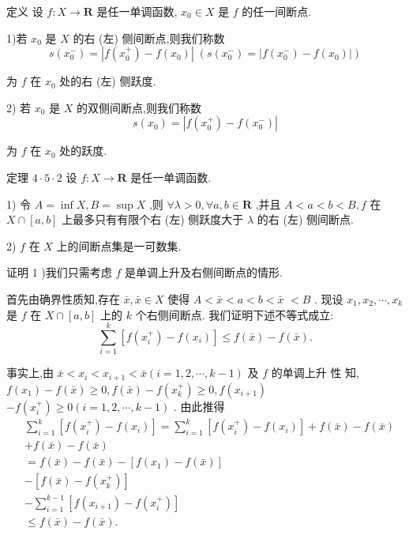 定义 设 $f : X \rightarrow  \mathbf{R}$ 是任一单调函数, ${x}_{0} \in  X$ 是 $f$ 的任一间断点.

1)若 ${x}_{0}$ 是 $X$ 的右 (左) 侧间断点,则我们称数
$$s\left( {x}_{0}^{ - }\right)  = \left| {f\left( {x}_{0}^{ + }\right)  - f\left( {x}_{0}\right) }\right| \;\left( {s\left( {x}_{0}^{ - }\right)  = \left| {f\left( {x}_{0}^{ - }\right)  - f\left( {x}_{0}\right) }\right| }\right)$$

为 $f$ 在 ${x}_{0}$ 处的右 (左) 侧跃度.

2) 若 ${x}_{0}$ 是 $X$ 的双侧间断点,则我们称数
$$s\left( {x}_{0}\right)  = \left| {f\left( {x}_{0}^{ + }\right)  - f\left( {x}_{0}^{ - }\right) }\right|$$

为 $f$ 在 ${x}_{0}$ 处的跃度.

定理 $4 \cdot  5 \cdot  2$ 设 $f : X \rightarrow  \mathbf{R}$ 是任一单调函数.

1) 令 $A = \inf X,B = \sup X$ ,则 $\forall \lambda  > 0,\forall a,b \in  \mathbf{R}$ ,并且 $A < a < b < B,f$ 在 $X \cap  \left\lbrack  {a,b}\right\rbrack$ 上最多只有有限个右 (左) 侧跃度大于 $\lambda$ 的右 (左) 侧间断点.

2) $f$ 在 $X$ 上的间断点集是一可数集.

证明 1 )我们只需考虑 $f$ 是单调上升及右侧间断点的情形.

首先由确界性质知,存在 $\bar{x},\bar{x} \in  X$ 使得 $A < \bar{x} < a < b < \bar{x}$  $< B$ . 现设 ${x}_{1},{x}_{2},\cdots ,{x}_{k}$ 是 $f$ 在 $X \cap  \left\lbrack  {a,b}\right\rbrack$ 上的 $k$ 个右侧间断点. 我们证明下述不等式成立:
$$\mathop{\sum }\limits_{{i = 1}}^{k}\left\lbrack  {f\left( {x}_{i}^{ + }\right)  - f\left( {x}_{i}\right) }\right\rbrack   \leq  f\left( \bar{x}\right)  - f\left( \bar{x}\right) .$$

事实上,由 $\bar{x} < {x}_{i} < {x}_{i + 1} < \bar{x}\left( {i = 1,2,\cdots ,k - 1}\right)$ 及 $f$ 的单调上升 性 知, $f\left( {x}_{1}\right)  - f\left( \bar{x}\right)  \geq  0,f\left( \bar{x}\right)  - f\left( {x}_{k}^{ + }\right)  \geq  0,f\left( {x}_{i + 1}\right)$  $- f\left( {x}_{i}^{ + }\right)  \geq  0\left( {i = 1,2,\cdots ,k - 1}\right)$ . 由此推得
\begin{align*}
	&\mathop{\sum }\limits_{{i = 1}}^{k}\left\lbrack  {f\left( {x}_{i}^{ + }\right)  - f\left( {x}_{i}\right) }\right\rbrack   = \mathop{\sum }\limits_{{i = 1}}^{k}\left\lbrack  {f\left( {x}_{i}^{ + }\right)  - f\left( {x}_{i}\right) }\right\rbrack   + f\left( \bar{x}\right)  - f\left( \bar{x}\right)\\
	&+ f\left( \bar{x}\right)  - f\left( \bar{x}\right)\\
	&= f\left( \bar{x}\right)  - f\left( \bar{x}\right)  - \left\lbrack  {f\left( {x}_{1}\right)  - f\left( \bar{x}\right) }\right\rbrack\\
	&- \left\lbrack  {f\left( \bar{x}\right)  - f\left( {x}_{k}^{ + }\right) }\right\rbrack\\
	&- \mathop{\sum }\limits_{{i = 1}}^{{k - 1}}\left\lbrack  {f\left( {x}_{i + 1}\right)  - f\left( {x}_{i}^{ + }\right) }\right\rbrack\\
	&\leq  f\left( \bar{x}\right)  - f\left( \bar{x}\right) .
\end{align*}

